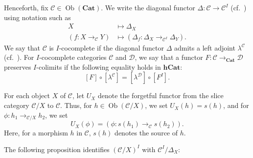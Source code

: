 \documentclass[12pt, a4paper]{amsart}
\theoremstyle{definition}
\newcommand{\Ob}{\mathop{\mathrm{Ob}}\nolimits}
\newcommand{\Cat}{{\mathbf{Cat}}}
\newcommand{\hCat}{{\mathbf{hCat}}}
\begin{document}
Henceforth, fix $\mathcal{C} \in \Ob(\Cat)$. We write the diagonal functor $\Delta : \mathcal{C} \rightarrow \mathcal{C}^I$ (cf.~\cite[Definition 3.1.1]{Riehl2016category}) using notation such as
\begin{align*}
    X &\mapsto \Delta_X \\
    (f : X \rightarrow_\mathcal{C} Y) &\mapsto (\Delta_f : \Delta_X \rightarrow_{\mathcal{C}^I} \Delta_Y).
\end{align*}
We say that $\mathcal{C}$ is $I$-cocomplete if the diagonal functor $\Delta$ admits a left adjoint $\lambda^\mathcal{C}$ (cf.~\cite[Proposition 4.6.1]{Riehl2016category}). 
For $I$-cocomplete categories $\mathcal{C}$ and $\mathcal{D}$, 
we say that a functor $F : \mathcal{C} \rightarrow_\Cat \mathcal{D}$ preserves $I$-colimits if the following equality holds in $\hCat$:
\[
[F] \circ [\lambda^\mathcal{C}] = [\lambda^\mathcal{D}] \circ [F^I].
\]

For each object $X$ of $\mathcal{C}$, let $U_X$ denote the forgetful functor from the slice category $\mathcal{C}/X$ to $\mathcal{C}$. Thus, for $h \in \Ob(\mathcal{C}/X)$, we set $U_X(h) = s(h)$, and for $\phi : h_1 \rightarrow_{\mathcal{C}/X} h_2$, we set
\[
U_X(\phi) = (\phi : s(h_1) \rightarrow_{\mathcal{C}} s(h_2)).
\]
Here, for a morphism $h$ in $\mathcal{C}$, $s(h)$ denotes the source of $h$.

The following proposition identifies $(\mathcal{C}/X)^I$ with $\mathcal{C}^I/\Delta_X$:
\end{document}
